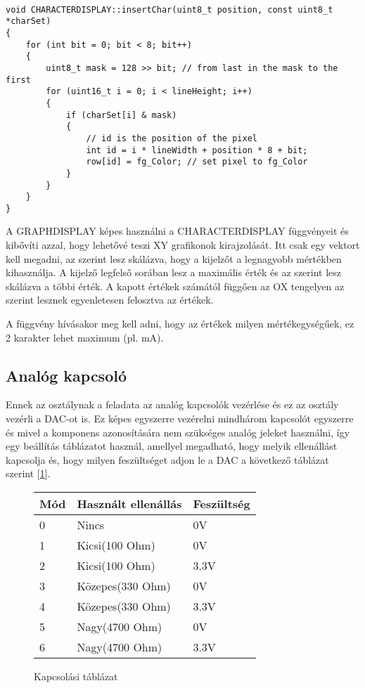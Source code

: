 \begin{lstlisting}

void CHARACTERDISPLAY::insertChar(uint8_t position, const uint8_t *charSet)
{
    for (int bit = 0; bit < 8; bit++)
    {
        uint8_t mask = 128 >> bit; // from last in the mask to the first
        for (uint16_t i = 0; i < lineHeight; i++)
        {
            if (charSet[i] & mask)
            {
                // id is the position of the pixel
                int id = i * lineWidth + position * 8 + bit;
                row[id] = fg_Color; // set pixel to fg_Color
            }
        }
    }
}

\end{lstlisting}


A GRAPHDISPLAY képes használni a CHARACTERDISPLAY függvényeit és kibővíti azzal,
hogy lehetővé teszi XY grafikonok kirajzolását. Itt csak egy vektort kell megadni,
az szerint lesz skálázva, hogy a kijelzőt a legnagyobb mértékben kihasználja.
A kijelző legfelső sorában lesz a maximális érték és az szerint lesz skálázva a
többi érték. A kapott értékek számától függően az OX tengelyen az szerint lesznek
egyenletesen felosztva az értékek.

A függvény hívásakor meg kell adni, hogy az értékek milyen mértékegységűek, ez 2
karakter lehet maximum (pl. mA). 



\subsection{Analóg kapcsoló}

Ennek az osztálynak a feladata az analóg kapcsolók vezérlése és ez az
osztály vezérli a DAC-ot is. Ez képes egyszerre vezérelni mindhárom kapcsolót
egyszerre és mivel a komponens azonosítására nem szükséges analóg jeleket
használni, így egy beállítás táblázatot használ, amellyel megadható, hogy 
melyik ellenállást kapcsolja és, hogy milyen feszültséget adjon le a DAC
a következő táblázat szerint [\ref{fig:KapcsoloMod}].

\begin{figure}[H]
    \centering
    \begin{tabular}{|l|l|l|}
    \hline
    Mód & Használt ellenállás & Feszültség \\ \hline
    0   & Nincs               & 0V         \\ \hline
    1   & Kicsi(100 Ohm)      & 0V         \\ \hline
    2   & Kicsi(100 Ohm)      & 3.3V       \\ \hline
    3   & Közepes(330 Ohm)    & 0V         \\ \hline
    4   & Közepes(330 Ohm)    & 3.3V       \\ \hline
    5   & Nagy(4700 Ohm)      & 0V         \\ \hline
    6   & Nagy(4700 Ohm)      & 3.3V       \\ \hline
\end{tabular}
\caption{Kapcsolási táblázat}
\label{fig:KapcsoloMod}
\end{figure}

